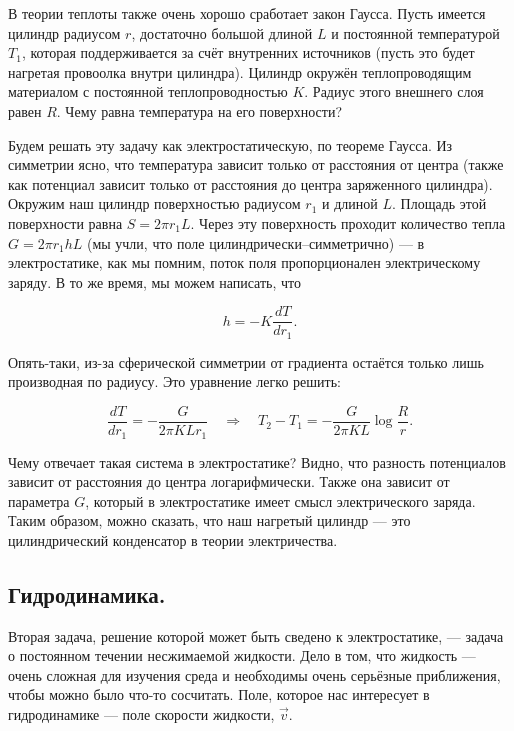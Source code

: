 \documentclass[12pt,a4paper]{article}
\numberwithin{equation}{section}
\numberwithin{equation}{section}
\begin{document}
В теории теплоты также очень хорошо сработает закон Гаусса. Пусть
имеется цилиндр радиусом $r$, достаточно большой длиной $L$ и
постоянной температурой $T_1$, которая поддерживается за счёт
внутренних источников (пусть это будет нагретая провоолка внутри
цилиндра). Цилиндр окружён теплопроводящим материалом с постоянной
теплопроводностью $K$. Радиус этого внешнего слоя равен $R$. Чему
равна температура на его поверхности?

Будем решать эту задачу как электростатическую, по теореме Гаусса. Из
симметрии ясно, что температура зависит только от расстояния от центра
(также как потенциал зависит только от расстояния до центра
заряженного цилиндра). Окружим наш цилиндр поверхностью радиусом $r_1$
и длиной $L$. Площадь этой поверхности равна $S = 2\pi r_1 L$. Через
эту поверхность проходит количество тепла $G = 2\pi r_1 h L$ (мы учли,
что поле цилиндрически--симметрично) --- в электростатике, как мы
помним, поток поля пропорционален электрическому заряду. В то же
время, мы можем написать, что

\begin{equation}
  \label{eq:heated_cylinder_1}
  h = -K \frac{dT}{dr_1}.
\end{equation}

Опять-таки, из-за сферической симметрии от градиента остаётся только
лишь производная по радиусу. Это уравнение легко решить: 

\begin{equation}
  \label{eq:heated_cylinder_2}
  \frac{dT}{dr_1} = -\frac{G}{2\pi K L r_1} \quad \Rightarrow \quad T_2 - T_1 =
  -\frac{G}{2\pi K L} \log \frac{R}{r}.
\end{equation}

Чему отвечает такая система в электростатике? Видно, что разность
потенциалов зависит от расстояния до центра логарифмически. Также она
зависит от параметра $G$, который в электростатике имеет смысл
электрического заряда. Таким образом, можно сказать, что наш нагретый
цилиндр --- это цилиндрический конденсатор в теории электричества.

\subsection{Гидродинамика.}
\label{sec:hydro}

Вторая задача, решение которой может быть сведено к электростатике,
--- задача о постоянном течении несжимаемой жидкости. Дело в том, что
жидкость --- очень сложная для изучения среда и необходимы очень
серьёзные приближения, чтобы можно было что-то сосчитать. Поле,
которое нас интересует в гидродинамике --- поле скорости жидкости,
$\vec{v}$. 
\end{document}
